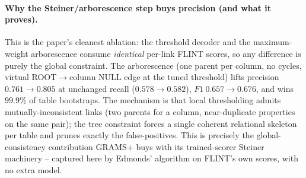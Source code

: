 \paragraph{Why the Steiner/arborescence step buys precision (and what it proves).}
This is the paper's cleanest ablation: the threshold decoder and the maximum-weight
arborescence consume \emph{identical} per-link FLINT scores, so any difference is
purely the global constraint. The arborescence (one parent per column, no cycles,
virtual ROOT$\to$column NULL edge at the tuned threshold) lifts precision
$0.761\!\to\!0.805$ at unchanged recall ($0.578\!\to\!0.582$),
$F1\ 0.657\!\to\!0.676$, and wins $99.9\%$ of table bootstraps. The mechanism is
that local thresholding admits mutually-inconsistent links (two parents for a
column, near-duplicate properties on the same pair); the tree constraint forces a
single coherent relational skeleton per table and prunes exactly the
false-positives. This is precisely the global-consistency contribution GRAMS+
buys with its trained-scorer Steiner machinery -- captured here by Edmonds'
algorithm on FLINT's own scores, with no extra model.

